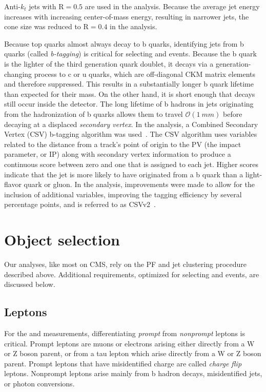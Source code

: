 Anti-$k_t$ jets with $\text{R}=0.5$ are used in the \eightTeV analysis. Because
the average jet energy increases with increasing center-of-mass energy,
resulting in narrower jets, the cone size was reduced to $\text{R}=0.4$ in the
\thirteenTeV analysis.

Because top quarks almost always decay to b quarks, identifying jets from b
quarks (called \emph{b-tagging}) is critical for selecting \ttW and \ttZ events.
Because the b quark is the lighter of the third generation quark doublet, it
decays via a generation-changing process to c or u quarks, which are
off-diagonal CKM matrix elements and therefore suppressed. This results in a
substantially longer b quark lifetime than expected for their mass. On the other
hand, it is short enough that decays still occur inside the detector. The long
lifetime of b hadrons in jets originating from the hadronization of b quarks
allows them to travel $\mathcal{O}(\SI{1}{mm})$ before decaying at a displaced
\emph{secondary vertex}. In the \eightTeV analysis, a Combined Secondary Vertex
(CSV) b-tagging algorithm was used~\cite{1748-0221-8-04-P04013}. The CSV
algorithm uses variables related to the distance from a track's point of origin
to the PV (the impact parameter, or IP) along with secondary vertex information
to produce a continuous score between zero and one that is assigned to each jet.
Higher scores indicate that the jet is more likely to have originated from a b
quark than a light-flavor quark or gluon. In the \thirteenTeV analysis,
improvements were made to allow for the inclusion of additional variables,
improving the tagging efficiency by several percentage points, and is referred
to as CSVv2~\cite{CMS-PAS-BTV-15-001}.

\section{Object selection}
\label{sec:object-selection}
Our analyses, like most on CMS, rely on the PF and jet clustering procedure
described above. Additional requirements, optimized for selecting \ttW and \ttZ
events, are discussed below.

\subsection{Leptons}
\label{ssec:leptons}
For the \ttW and \ttZ measurements, differentiating \emph{prompt} from
\emph{nonprompt} leptons is critical. Prompt leptons are muons or electrons
arising either directly from a W or Z boson parent, or from a tau lepton which
arise directly from a W or Z boson parent. Prompt leptons that have
misidentified charge are called \emph{charge flip} leptons. Nonprompt leptons
arise mainly from b hadron decays, misidentified jets, or photon conversions.

